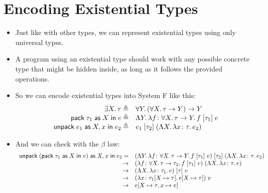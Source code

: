 \documentclass{lecturenotes}
\newcommand{\tabs}[3]{\ensuremath{\lambda #1 \colon #2.\,#3}}
\newcommand{\app}[2]{\ensuremath{#1\;#2}}
\newcommand{\fatype}[2]{\ensuremath{\forall #1.\,#2}}
\newcommand{\Abs}[2]{\Lambda #1.\,#2}
\newcommand{\App}[2]{#1\;[#2]}
\newcommand{\extype}[2]{\ensuremath{\exists #1.\,#2}}
\newcommand{\pack}[3]{\ensuremath{\textsf{pack}\mkern5mu#1\mathrel{\textsf{as}}#2\mathrel{\textsf{in}}#3}}
\newcommand{\unpack}[4]{\ensuremath{\textsf{unpack}\mkern5mu#1\mathrel{\textsf{as}} #2, #3 \mathrel{\textsf{in}} #4}}
\begin{document}
\section{Encoding Existential Types}
\label{sec:encod-exist-types}

\begin{itemize}
\item Just like with other types, we can represent existential types using only universal types.
\item A program using an existential type should work with any possible concrete type that might be hidden inside, as long as it follows the provided operations.
\item So we can encode existential types into System F like this:
  $$
  \begin{array}{rl}
    \extype{X}{\tau} \triangleq& \fatype{Y}{(\fatype{X}{\tau} \to Y) \to Y}\\
    \pack{\tau_1}{X}{e} \triangleq& \Abs{Y}{\tabs{f}{\fatype{X}{\tau \to Y}}{\app{\App{f}{\tau_1}}{e}}}\\
    \unpack{e_1}{X}{x}{e_2} \triangleq& \app{\App{e_1}{\tau_2}}{(\Abs{X}{\tabs{x}{\tau}{e_2}})}
  \end{array}
  $$
\item And we can check with the $\beta$ law:
  $$
  \begin{array}{rl}
    \unpack{(\pack{\tau_1}{X}{v})}{X}{x}{e_2} =& \app{\App{(\Abs{Y}{\tabs{f}{\fatype{X}{\tau \to Y}}{\app{\App{f}{\tau_1}}{v}}})}{\tau_2}}{(\Abs{X}{\tabs{x}{\tau}{e_2}})}\\
    \to& \app{(\tabs{f}{\fatype{X}{\tau \to \tau_2}}{\app{\App{f}{\tau_1}}{v}})}{(\Abs{X}{\tabs{x}{\tau}{e}})}\\
    \to& \app{\App{(\Abs{X}{\tabs{x}{\tau_1}{e}})}{\tau}}{v}\\
    \to& \app{(\tabs{x}{\tau_1[X\mapsto\tau]}{e[X \mapsto \tau}])}{v}\\
    \to& e[X \mapsto \tau, x \mapsto v]
  \end{array}
  $$
\end{itemize}
\end{document}
